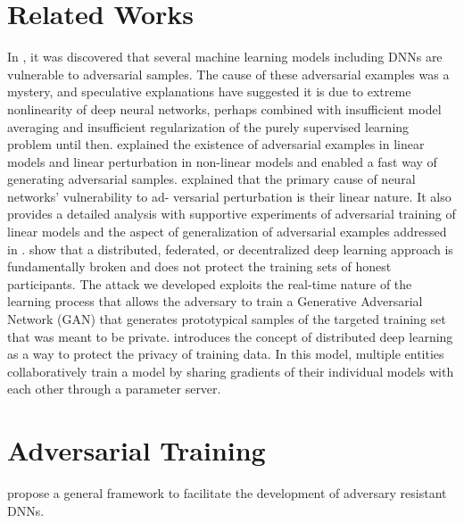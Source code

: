\documentclass{article}
\begin{document}
\section{Related Works}
In \cite{szegedy2013intriguing}, it was discovered that several machine learning models including DNNs are vulnerable to adversarial samples. The cause of
these adversarial examples was a mystery, and speculative explanations have suggested it is due to extreme nonlinearity of deep
neural networks, perhaps combined with insufficient model averaging and insufficient regularization of the purely supervised
learning problem until then. \cite{szegedy2013intriguing} explained the existence of adversarial examples in linear models and linear perturbation in non-linear models and enabled a fast way of generating adversarial samples. 
\cite{goodfellow2014explaining} explained that the  primary cause of neural networks’ vulnerability to ad-
versarial perturbation is their linear nature. It also provides a detailed analysis with supportive experiments of adversarial training of linear models and the aspect of generalization of adversarial examples addressed in \cite{papernot2016transferability}.
\cite{hitaj2017deep} show that a distributed, federated,
or decentralized deep learning approach is fundamentally broken
and does not protect the training sets of honest participants. The
attack we developed exploits the real-time nature of the learning
process that allows the adversary to train a Generative Adversarial
Network (GAN) that generates prototypical samples of the targeted
training set that was meant to be private.
\cite{abadi2016deep} introduces the concept of distributed deep learning as a way to protect the privacy
of training data. In this model, multiple entities collaboratively train a model by sharing gradients of their individual
models with each other through a parameter server.

\section{Adversarial Training}
\cite{wang2016learning} propose a general framework to facilitate the development of adversary resistant DNNs.
\end{document}
